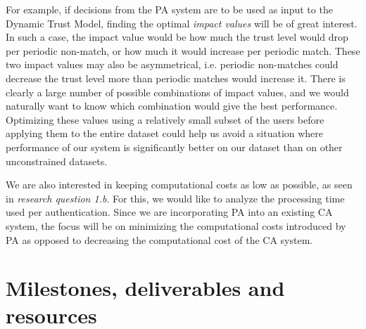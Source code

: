 \documentclass[informationsecurity]{gucmasterproject}
\begin{document}
For example, if decisions from the PA system are to be used as input to the Dynamic Trust Model, finding the optimal \textit{impact values} will be of great interest.
In such a case, the impact value would be how much the trust level would drop per periodic non-match, or how much it would increase per periodic match.
These two impact values may also be asymmetrical, i.e. periodic non-matches could decrease the trust level more than periodic matches would increase it.
There is clearly a large number of possible combinations of impact values, and we would naturally want to know which combination would give the best performance.
Optimizing these values using a relatively small subset of the users before applying them to the entire dataset could help us avoid a situation where performance of our system is significantly better on our dataset than on other unconstrained datasets.

We are also interested in keeping computational costs as low as possible, as seen in \textit{research question 1.b}.
For this, we would like to analyze the processing time used per authentication.
Since we are incorporating PA into an existing CA system, the focus will be on minimizing the computational costs introduced by PA as opposed to decreasing the computational cost of the CA system.








\chapter{Milestones, deliverables and resources}
\end{document}
